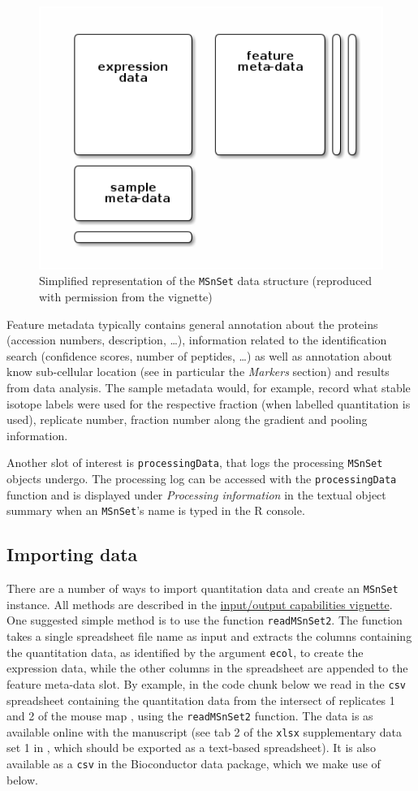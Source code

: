 \begin{figure}[!ht]
  \centering
  \includegraphics[width=.5\textwidth]{./Figures/msnset.png}
  \caption{Simplified representation of the \texttt{MSnSet} data
    structure (reproduced with permission from the 
    vignette)}
  \label{fig:msnset}
\end{figure}

Feature metadata typically contains general annotation about the
proteins (accession numbers, description, \ldots), information related
to the identification search (confidence scores, number of peptides,
\ldots) as well as annotation about know sub-cellular location (see in
particular the \textit{Markers} section) and results from data
analysis. The sample metadata would, for example, record what stable
isotope labels were used for the respective fraction (when labelled
quantitation is used), replicate number, fraction number along the
gradient and pooling information.

Another slot of interest is \texttt{processingData}, that logs the
processing \texttt{MSnSet} objects undergo. The processing log can be
accessed with the \texttt{processingData} function and is displayed
under \textit{Processing information} in the textual object summary
when an \texttt{MSnSet}'s name is typed in the R console.

\subsection*{Importing data}

There are a number of ways to import quantitation data and create an
\texttt{MSnSet} instance. All methods are described in the
\href{http://bioconductor.org/packages/release/bioc/vignettes/MSnbase/inst/doc/MSnbase-io.pdf}{input/output
  capabilities vignette}. One suggested simple method is to use the
function \texttt{readMSnSet2}. The function takes a single spreadsheet
file name as input and extracts the columns containing the
quantitation data, as identified by the argument \texttt{ecol}, to
create the expression data, while the other columns in the spreadsheet
are appended to the feature meta-data slot.  By example, in the code
chunk below we read in the \texttt{csv} spreadsheet containing the
quantitation data from the intersect of replicates 1 and 2 of the
mouse map \cite{hyper}, using the \texttt{readMSnSet2} function. The
data is as available online with the manuscript (see tab 2 of the
\texttt{xlsx} supplementary data set 1 in \cite{hyper}, which should
be exported as a text-based spreadsheet). It is also available as a
\texttt{csv} in the Bioconductor  data
package, which we make use of below.

